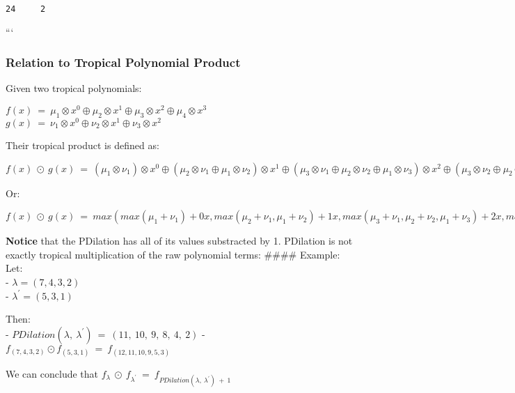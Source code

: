 \documentclass[11pt]{amsart}
\theoremstyle{remark}
\theoremstyle{definition}
\theoremstyle{remark}
\numberwithin{equation}{section}
\begin{document}
\begin{verbatim}
24     2
\end{verbatim}

```

\subsubsection{Relation to Tropical Polynomial
Product}\label{relation-to-tropical-polynomial-product}

Given two tropical polynomials:

\texttt{$f(x)\ =\ \mu_{1}\otimes x^0\oplus\mu_{2}\otimes x^1\oplus\mu_{3}\otimes x^2\oplus\mu_{4}\otimes x^3$}
\texttt{$g(x)\ =\ \nu_{1}\otimes x^0\oplus\nu_{2}\otimes x^1\oplus\nu_{3}\otimes x^2$}

Their tropical product is defined as:

\texttt{$f(x)\ \odot\ g(x)\ =\ (\mu_{1}\otimes\nu_{1})\otimes x^0\oplus(\mu_{2}\otimes\nu_{1}\oplus\mu_{1}\otimes\nu_{2})\otimes x^1\oplus(\mu_{3}\otimes\nu_{1}\oplus\mu_{2}\otimes\nu_{2}\oplus\mu_{1}\otimes\nu_{3})\otimes x^2\oplus(\mu_{3}\otimes\nu_{2}\oplus\mu_{2}\otimes\nu_{3}\oplus\mu_{1}\otimes\nu_{4})\otimes x^3\oplus(\mu_{3}\otimes\nu_{3}\oplus\mu_{2}\otimes\nu_{4})\otimes x^4\oplus(\mu_{3}\otimes\nu_{4})\otimes x^5$}

Or:

\texttt{$f(x)\ \odot\ g(x)\ =\ max(max(\mu_{1}+\nu_{1})+0x,max(\mu_{2}+\nu_{1},\mu_{1}+\nu_{2})+1x,max(\mu_{3}+\nu_{1},\mu_{2}+\nu_{2},\mu_{1}+\nu_{3})+2x,max(\mu_{3}+\nu_{2},\mu_{2}+\nu_{3},\mu_{1}+\nu_{4})+3x,max(\mu_{3}+\nu_{3},\mu_{2}+\nu_{4})+4x,max(\mu_{3}+\nu_{4})+5x)$}

\textbf{Notice} that the PDilation has all of its values substracted by
1. PDilation is not exactly tropical multiplication of the raw
polynomial terms: \#\#\#\# Example: Let:\\
- $\lambda = (7, 4, 3, 2)$\\
- $\lambda^\prime = (5, 3, 1)$

Then:\\
- \texttt{$PDilation(\lambda,\ \lambda^\prime)\ =\ (11,\ 10,\ 9,\ 8,\ 4,\ 2)$}
- \texttt{$f_{(7,4,3,2)} \odot f_{(5,3,1)}\ =\ f_{(12,11,10,9,5,3)}$}

We can conclude that
\texttt{$f_{\lambda}\ \odot\ f_{\lambda^\prime}\ =\ f_{PDilation(\lambda,\ \lambda^\prime)\ +\ 1}$}
\end{document}
